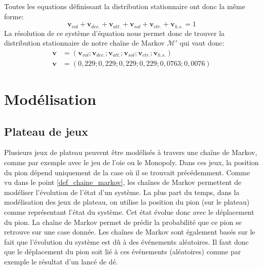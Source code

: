 \documentclass[letterpaper]{article}
\begin{document}
      Toutes les equations définissant la distribution stationnaire ont donc  la même forme:
      $$\mathbf{v}_{vol} + \mathbf{v}_{dec.} + \mathbf{v}_{att.} + \mathbf{v}_{sol} + 
	\mathbf{v}_{ctr.} + \mathbf{v}_{h.s.} = 1$$
      La résolution de ce système d'équation nous permet donc de trouver la distribution
      stationnaire de notre chaîne de Markov $\mathcal{M}'$ qui vaut donc:
      \begin{align*}
       \mathbf{v} &= (\mathbf{v}_{vol}; \mathbf{v}_{dec.}; \mathbf{v}_{att.}; \mathbf{v}_{sol}; 
	  \mathbf{v}_{ctr.}; \mathbf{v}_{h.s.})\\
      \mathbf{v} &= (0,229; 0,229; 0,229; 0,229; 0,0763; 0,0076)
      \end{align*}
  
\section{Modélisation}

  \subsection{Plateau de jeux}
    Plusieurs jeux de plateau peuvent être modélisés à travers une chaîne de Markov,
    comme par exemple avec le jeu de l'oie ou le Monopoly.  Dans ces jeux,
    la position du pion dépend uniquement de la case où il se trouvait précédemment.
    Comme vu dans le point \ref{def_chaine_markov}, les chaînes de Markov permettent
    de modéliser l'évolution de l'état d'un système.  La plus part du temps, dans
    la modélisation des jeux de plateau, on utilise la position du pion (sur le plateau)
    comme représentant l'état du système.  Cet état évolue donc avec le déplacement du
    pion.  La chaîne de Markov permet de prédir la probabilité que ce pion se retrouve
    sur une case donnée.  Les chaînes de Markov sont également basés sur le fait que 
    l'évolution du système est dû à des événements aléatoires.  Il faut donc que le
    déplacement du pion soit lié à ces événements (aléatoires) comme par exemple le 
    résultat d'un lancé de dé. 
  
\end{document}
